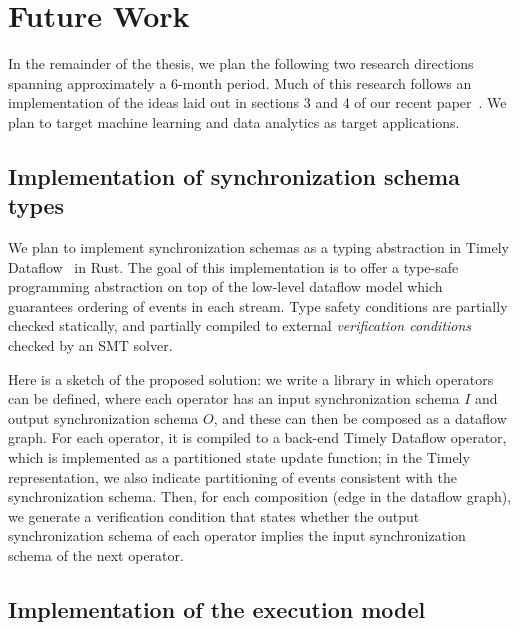 \section{Future Work}
\label{sec:fw}


In the remainder of the thesis, we plan the following two research directions spanning approximately a 6-month period.
Much of this research follows an implementation of the ideas laid out in sections 3 and 4 of our recent paper~\cite{pods21}.
We plan to target machine learning and data analytics as target applications.

\subsection{Implementation of synchronization schema types}

We plan to implement synchronization schemas as a typing abstraction in Timely Dataflow~\cite{Timely} in Rust.
The goal of this implementation is to offer a type-safe programming abstraction on top of the low-level dataflow model which guarantees ordering of events in each stream.
Type safety conditions are partially checked statically, and partially compiled
to external \emph{verification conditions} checked by an SMT solver.

Here is a sketch of the proposed solution:
we write a library in which operators can be defined, where each operator has an input synchronization schema $I$ and output synchronization schema $O$,
and these can then be composed as a dataflow graph.
For each operator, it is compiled to a back-end Timely Dataflow operator,
which is implemented as a partitioned state update function;
in the Timely representation, we also indicate partitioning of events consistent
with the synchronization schema.
Then, for each composition (edge in the dataflow graph),
we generate a verification condition that states whether the output synchronization schema of each operator implies the input synchronization schema of the next operator.

\subsection{Implementation of the execution model}

